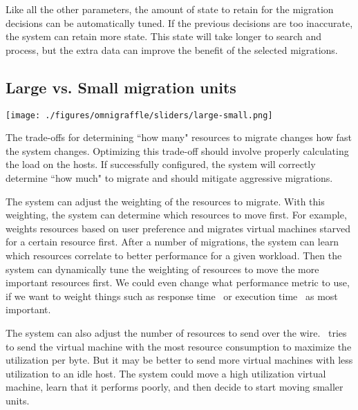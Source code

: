 Like all the other parameters, the amount of state to retain for the migration decisions can be automatically tuned. If the previous decisions are too inaccurate, the system can retain more state. This state will take longer to search and process, but the extra data can improve the benefit of the selected migrations. 

\subsection{Large vs. Small migration units}
\begin{minipage}{0.8\textwidth}
	\texttt{[image: ./figures/omnigraffle/sliders/large-small.png]} 
	\vspace{0.2in}
\end{minipage}

The trade-offs for determining ``how many" resources to migrate changes how fast the system changes. Optimizing this trade-off should involve properly calculating the load on the hosts. If successfully configured, the system will correctly determine ``how much" to migrate and should mitigate aggressive migrations.

The system can adjust the weighting of the resources to migrate. With this weighting, the system can determine which resources to move first. For example,~\cite{xen-wlb} weights resources based on user preference and migrates virtual machines starved for a certain resource first.  After a number of migrations, the system can learn which resources correlate to better performance for a given workload.  Then the system can dynamically tune the weighting of resources to move the more important resources first. We could even change what performance metric to use, if we want to weight things such as response time~\cite{manjunath:ijais2012-paas-provisioing} or execution time~\cite{vilutis:ITI2012-cloud-load-balancing} as most important.

The system can also adjust the number of resources to send over the wire.~\cite{wood:nsdi07-sandpiper} tries to send the virtual machine with the most resource consumption to maximize the utilization per byte. But it may be better to send more virtual machines with less utilization to an idle host. The system could move a high utilization virtual machine, learn that it performs poorly, and then decide to start moving smaller units.
	
